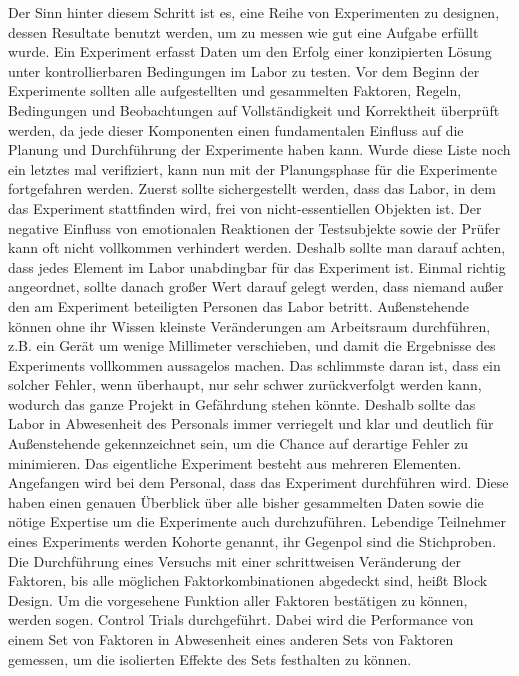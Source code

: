     Der Sinn hinter diesem Schritt ist es, eine Reihe von Experimenten zu designen, dessen 
    Resultate benutzt werden, um zu messen wie gut eine Aufgabe erfüllt wurde. Ein Experiment 
    erfasst Daten um den Erfolg einer konzipierten Lösung unter kontrollierbaren Bedingungen im Labor 
    zu testen. Vor dem Beginn der Experimente sollten alle aufgestellten und gesammelten Faktoren, 
    Regeln, Bedingungen und Beobachtungen auf Vollständigkeit und Korrektheit überprüft werden, da 
    jede dieser Komponenten einen fundamentalen Einfluss auf die Planung und Durchführung der 
    Experimente haben kann.  Wurde diese Liste noch ein letztes mal verifiziert,  kann nun mit 
    der Planungsphase für die Experimente fortgefahren werden. 
    Zuerst sollte sichergestellt werden, dass das Labor, in dem das Experiment stattfinden wird, 
    frei von nicht-essentiellen Objekten ist. Der negative Einfluss von emotionalen Reaktionen der 
    Testsubjekte sowie der Prüfer kann oft nicht vollkommen verhindert werden. Deshalb sollte man 
    darauf achten, dass jedes Element im Labor unabdingbar für das Experiment ist. Einmal richtig 
    angeordnet, sollte danach großer Wert darauf gelegt werden, dass niemand außer den am Experiment 
    beteiligten Personen das Labor betritt. Außenstehende können ohne ihr Wissen kleinste Veränderungen 
    am Arbeitsraum durchführen, z.B. ein Gerät um wenige Millimeter verschieben, und damit die 
    Ergebnisse des Experiments vollkommen aussagelos machen. Das schlimmste daran ist, dass ein 
    solcher Fehler, wenn überhaupt, nur sehr schwer zurückverfolgt werden kann, wodurch das ganze 
    Projekt in Gefährdung stehen könnte. Deshalb sollte das Labor in Abwesenheit des Personals 
    immer verriegelt und klar und deutlich für Außenstehende gekennzeichnet sein, um die Chance 
    auf derartige Fehler zu minimieren. Das eigentliche Experiment besteht aus mehreren Elementen. 
    Angefangen wird bei dem Personal, dass das Experiment durchführen wird. Diese haben einen 
    genauen Überblick über alle bisher gesammelten Daten sowie die nötige Expertise um die 
    Experimente auch durchzuführen. Lebendige Teilnehmer eines Experiments werden Kohorte genannt, 
    ihr Gegenpol sind die Stichproben. Die Durchführung eines Versuchs mit einer schrittweisen 
    Veränderung der Faktoren, bis alle möglichen Faktorkombinationen abgedeckt sind, heißt Block 
    Design. Um die vorgesehene Funktion aller Faktoren bestätigen zu können, werden sogen. Control 
    Trials durchgeführt. Dabei wird die Performance von einem Set von Faktoren in Abwesenheit eines 
    anderen Sets von Faktoren gemessen, um die isolierten Effekte des Sets festhalten zu können. 


